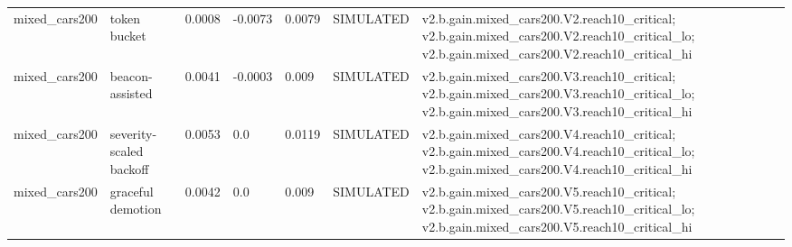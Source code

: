 \begin{table}[t]
\begin{tabular}{lllllll}
mixed\_cars200 & token bucket & 0.0008 & -0.0073 & 0.0079 & SIMULATED & v2.b.gain.mixed\_cars200.V2.reach10\_critical; v2.b.gain.mixed\_cars200.V2.reach10\_critical\_lo; v2.b.gain.mixed\_cars200.V2.reach10\_critical\_hi \\
mixed\_cars200 & beacon-assisted & 0.0041 & -0.0003 & 0.009 & SIMULATED & v2.b.gain.mixed\_cars200.V3.reach10\_critical; v2.b.gain.mixed\_cars200.V3.reach10\_critical\_lo; v2.b.gain.mixed\_cars200.V3.reach10\_critical\_hi \\
mixed\_cars200 & severity-scaled backoff & 0.0053 & 0.0 & 0.0119 & SIMULATED & v2.b.gain.mixed\_cars200.V4.reach10\_critical; v2.b.gain.mixed\_cars200.V4.reach10\_critical\_lo; v2.b.gain.mixed\_cars200.V4.reach10\_critical\_hi \\
mixed\_cars200 & graceful demotion & 0.0042 & 0.0 & 0.009 & SIMULATED & v2.b.gain.mixed\_cars200.V5.reach10\_critical; v2.b.gain.mixed\_cars200.V5.reach10\_critical\_lo; v2.b.gain.mixed\_cars200.V5.reach10\_critical\_hi \\
\bottomrule
\end{tabular}
\end{table}
